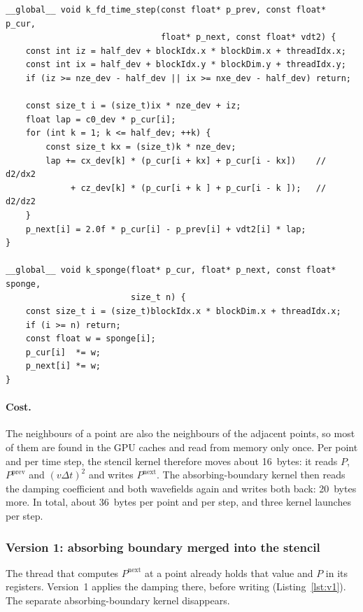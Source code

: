 \documentclass[letterpaper,11pt,leqno]{article}
\begin{document}
\noindent\begin{minipage}{\linewidth}
\begin{lstlisting}[style=cuda, caption={Version 0: stencil kernel and separate absorbing-boundary kernel.}, label={lst:v0}]
__global__ void k_fd_time_step(const float* p_prev, const float* p_cur,
                               float* p_next, const float* vdt2) {
    const int iz = half_dev + blockIdx.x * blockDim.x + threadIdx.x;
    const int ix = half_dev + blockIdx.y * blockDim.y + threadIdx.y;
    if (iz >= nze_dev - half_dev || ix >= nxe_dev - half_dev) return;

    const size_t i = (size_t)ix * nze_dev + iz;
    float lap = c0_dev * p_cur[i];
    for (int k = 1; k <= half_dev; ++k) {
        const size_t kx = (size_t)k * nze_dev;
        lap += cx_dev[k] * (p_cur[i + kx] + p_cur[i - kx])    // d2/dx2
             + cz_dev[k] * (p_cur[i + k ] + p_cur[i - k ]);   // d2/dz2
    }
    p_next[i] = 2.0f * p_cur[i] - p_prev[i] + vdt2[i] * lap;
}

__global__ void k_sponge(float* p_cur, float* p_next, const float* sponge,
                         size_t n) {
    const size_t i = (size_t)blockIdx.x * blockDim.x + threadIdx.x;
    if (i >= n) return;
    const float w = sponge[i];
    p_cur[i]  *= w;
    p_next[i] *= w;
}
\end{lstlisting}
\end{minipage}

\paragraph{Cost.}
The neighbours of a point are also the neighbours of the adjacent points, so
most of them are found in the GPU caches and read from memory only once.
Per point and per time step, the stencil kernel therefore moves about
16~bytes: it reads $P$, $P^{\mathrm{prev}}$ and $(v\Delta t)^2$ and writes
$P^{\mathrm{next}}$. The absorbing-boundary kernel then reads the damping
coefficient and both wavefields again and writes both back: 20~bytes more.
In total, about 36~bytes per point and per step, and three kernel launches
per step.

\subsubsection{Version 1: absorbing boundary merged into the stencil}

The thread that computes $P^{\mathrm{next}}$ at a point already holds that
value and $P$ in its registers. Version~1 applies the damping there, before
writing (Listing~\ref{lst:v1}). The separate absorbing-boundary kernel
disappears.
\end{document}
